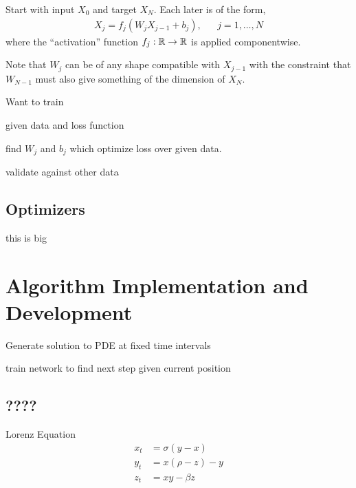 \documentclass[10pt]{article}
\begin{document}
Start with input \( X_0 \) and target \( X_N \). Each later is of the form,
\begin{align*}
    X_j = f_j(W_j X_{j-1} + b_j), && j=1,\ldots, N
\end{align*}
where the ``activation'' function \( f_j:\mathbb{R}\to\mathbb{R} \) is applied componentwise.

Note that \( W_j \) can be of any shape compatible with \( X_{j-1} \) with the constraint that \( W_{N-1} \) must also give something of the dimension of \( X_N \).

Want to train

given data and loss function

find \( W_j \) and \( b_j \)  which optimize loss over given data.

validate against other data

\subsection{Optimizers}
this is big




\section{Algorithm Implementation and Development}

Generate solution to PDE at fixed time intervals

train network to find next step given current position





\subsection{????}
Lorenz Equation
\begin{align*}
    x_t &= \sigma(y-x) \\
    y_t &= x (\rho-z)-y \\
    z_t &= x y-\beta z
\end{align*}

\iffalse
\begin{align*}
    \pp{}{t} \left[\begin{array}{c}x\\y\\z\end{array}\right]
    =
    \left[\begin{array}{c}
        \sigma(y-x) \\
        x (\rho-z)-y \\
        x y-\beta z
    \end{array}\right]
\end{align*}
\fi
\end{document}
